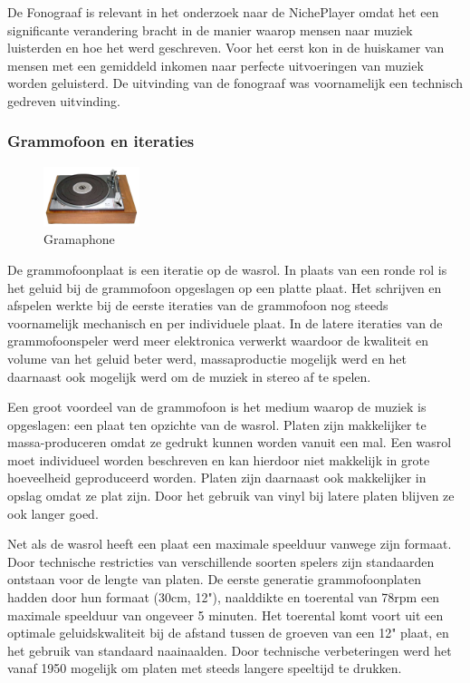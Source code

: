 De Fonograaf is relevant in het onderzoek naar de NichePlayer omdat het een significante verandering bracht in de manier waarop mensen naar muziek luisterden en hoe het werd geschreven. Voor het eerst kon in de huiskamer van mensen met een gemiddeld inkomen naar perfecte uitvoeringen van muziek worden geluisterd. De uitvinding van de fonograaf was voornamelijk een technisch gedreven uitvinding.


\subsubsection*{Grammofoon en iteraties}
\begin{figure}
    \centering
    \includegraphics[width=0.25\textwidth]{assets/critical-review/Gramaphone.jpeg}
    \caption{Gramaphone}
    \label{fig:critical-review:Gramaphone}
\end{figure}
De grammofoonplaat is een iteratie op de wasrol. In plaats van een ronde rol is het geluid bij de grammofoon opgeslagen op een platte plaat. Het schrijven en afspelen werkte bij de eerste iteraties van de grammofoon nog steeds voornamelijk mechanisch en per individuele plaat. In de latere iteraties van de grammofoonspeler werd meer elektronica verwerkt waardoor de kwaliteit en volume van het geluid beter werd, massaproductie mogelijk werd en het daarnaast ook mogelijk werd om de muziek in stereo af te spelen.

Een groot voordeel van de grammofoon is het medium waarop de muziek is opgeslagen: een plaat ten opzichte van de wasrol. Platen zijn makkelijker te massa-produceren omdat ze gedrukt kunnen worden vanuit een mal. Een wasrol moet individueel worden beschreven en kan hierdoor niet makkelijk in grote hoeveelheid geproduceerd worden. Platen zijn daarnaast ook makkelijker in opslag omdat ze plat zijn. Door het gebruik van vinyl bij latere platen blijven ze ook langer goed.

Net als de wasrol heeft een plaat een maximale speelduur vanwege zijn formaat. Door technische restricties van verschillende soorten spelers zijn standaarden ontstaan voor de lengte van platen. De eerste generatie grammofoonplaten hadden door hun formaat (30cm, 12"), naalddikte en toerental van 78rpm een maximale speelduur van ongeveer 5 minuten. Het toerental komt voort uit een optimale geluidskwaliteit bij de afstand tussen de groeven van een 12" plaat, en het gebruik van standaard naainaalden. Door technische verbeteringen werd het vanaf 1950 mogelijk om platen met steeds langere speeltijd te drukken. 

